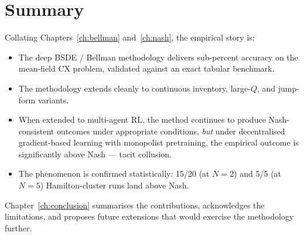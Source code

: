 \section{Summary}

Collating Chapters~\ref{ch:bellman} and~\ref{ch:nash}, the empirical story is:
\begin{itemize}[leftmargin=2em]
  \item The deep BSDE / Bellman methodology delivers sub-percent accuracy on the mean-field CX problem, validated against an exact tabular benchmark.
  \item The methodology extends cleanly to continuous inventory, large-$Q$, and jump-form variants.
  \item When extended to multi-agent RL, the method continues to produce Nash-consistent outcomes under appropriate conditions, \emph{but} under decentralised gradient-based learning with monopolist pretraining, the empirical outcome is significantly above Nash --- tacit collusion.
  \item The phenomenon is confirmed statistically: 15/20 (at $N=2$) and 5/5 (at $N=5$) Hamilton-cluster runs land above Nash.
\end{itemize}
Chapter~\ref{ch:conclusion} summarises the contributions, acknowledges the limitations, and proposes future extensions that would exercise the methodology further.
